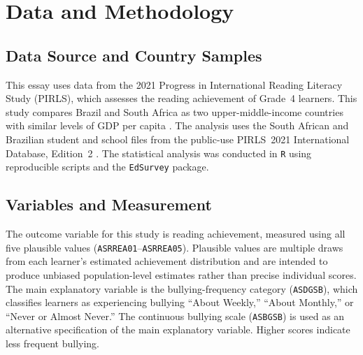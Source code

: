 \section{Data and Methodology}

\subsection{Data Source and Country Samples}

This essay uses data from the 2021 Progress in International Reading
Literacy Study (PIRLS), which assesses the reading achievement of Grade~4
learners. This study compares Brazil and South Africa as
two upper-middle-income countries with similar levels of GDP per capita
\citep{spaull2023pirls}. The analysis uses the South African and Brazilian student and school files from the public-use PIRLS~2021 International Database, Edition~2 \citep{iea2024pirlsdata}. The statistical analysis was conducted in
\texttt{R} using reproducible scripts and the \texttt{EdSurvey} package.

\subsection{Variables and Measurement}

The outcome variable for this study is reading achievement, measured using
all five plausible values (\texttt{ASRREA01}--\texttt{ASRREA05}).
Plausible values are multiple draws from each learner's estimated
achievement distribution and are intended to produce unbiased
population-level estimates rather than precise individual scores.
The main explanatory variable is the bullying-frequency category
(\texttt{ASDGSB}), which classifies learners as experiencing bullying
``About Weekly,'' ``About Monthly,'' or ``Never or Almost Never.''
The continuous bullying scale (\texttt{ASBGSB}) is used as an alternative
specification of the main explanatory variable. Higher scores indicate
less frequent bullying.

